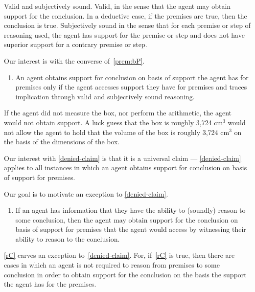 \documentclass[10pt]{article}
\begin{document}
\begin{note}
  Valid and subjectively sound.
  Valid, in the sense that the agent may obtain support for the conclusion.
  In a deductive case, if the premises are true, then the conclusion is true.
  Subjectively sound in the sense that for each premise or step of reasoning used, the agent has support for the premise or step and does not have superior support for a contrary premise or step.
\end{note}

\begin{note}[Focus]
Our interest is with the converse of~\ref{prem:bP}.

\begin{enumerate}[label=\mp{}, ref=\mp{}]
\item\label{denied-claim} An agent obtains support for conclusion on basis of support the agent has for premises only if the agent accesses support they have for premises and traces implication through valid and subjectively sound reasoning.
\end{enumerate}
If the agent did not measure the box, nor perform the arithmetic, the agent would not obtain support.
A luck guess that the box is roughly 3,724 cm\(^{3}\) would not allow the agent to hold that the volume of the box is roughly 3,724 cm\(^{3}\) on the basis of the dimensions of the box.
\end{note}

\begin{note}[Alternative]
  Our interest with \ref{denied-claim} is that it is a universal claim --- \ref{denied-claim} applies to all instances in which an agent obtains support for conclusion on basis of support for premises.

  Our goal is to motivate an exception to \ref{denied-claim}.

  \begin{enumerate}[label=\rC{}, ref=\rC{}]
  \item\label{rC} If an agent has information that they have the ability to (soundly) reason to some conclusion, then the agent may obtain support for the conclusion on basis of support for premises that the agent would access by witnessing their ability to reason to the conclusion.
  \end{enumerate}

  \ref{rC} carves an exception to~\ref{denied-claim}.
  For, if~\ref{rC} is true, then there are cases in which an agent is not required to reason from premises to some conclusion in order to obtain support for the conclusion on the basis the support the agent has for the premises.
\end{note}
\end{document}
